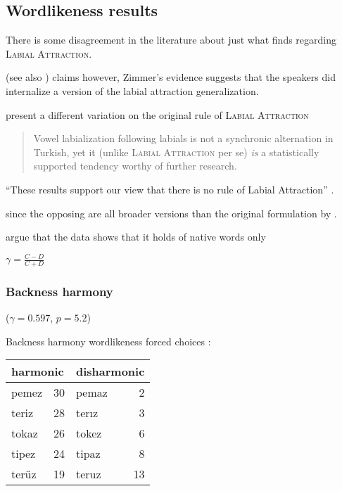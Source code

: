 \subsection{Wordlikeness results}

There is some disagreement in the literature about just what \citet{Zimmer1969} finds regarding \textsc{Labial Attraction}.

\citet{Zimmer1969}
(see also \citet[][4]{Zuraw2000})
claims however, Zimmer's evidence suggests that the speakers did internalize a version of the labial attraction generalization.

\citet{Inkelas2001} present a different variation on the original rule of \textsc{Labial Attraction}

\begin{quotation}
Vowel labialization following labials is not a synchronic alternation in Turkish, yet it (unlike \textsc{Labial Attraction} per se) \emph{is} a statistically supported tendency worthy of further research. \citep[][196, emphasis in original]{Inkelas2001}
\end{quotation}

``These results support our view that there is no rule of Labial Attraction'' \citep[][225]{Clements1982}.

since the opposing are all broader versions than the original formulation by \citeauthor{Lees1966a}.

\citet{Ito1993} argue that the data shows that it holds of native words only

\citet{Goodman1954}

\ex $\displaystyle \gamma = \frac{C - D}{C + D}$ \xe

\subsubsection{Backness harmony}

($\gamma = 0.597$, $p = 5.2$) 

Backness harmony wordlikeness forced choices \citep[314]{Zimmer1969}: \vspace{6pt} \\ 
\begin{tabular}{l r l r}
\toprule
\multicolumn{2}{l}{harmonic} & \multicolumn{2}{l}{disharmonic} \\
\midrule
pemez & 30                   & pemaz & 2  \\
teriz & 28                   & terız & 3  \\
tokaz & 26                   & tokez & 6  \\
tipez & 24                   & tipaz & 8  \\ 
terüz & 19                   & teruz & 13 \\ %
\bottomrule
\end{tabular}

